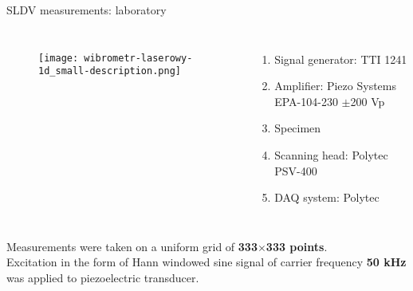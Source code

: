 \documentclass[10pt,aspectratio=169,dvipsnames]{beamer} %
\begin{document}
	\begin{frame}[t]{SLDV measurements: laboratory}
		\begin{columns}[T]
			\begin{figure}
				\texttt{[image: wibrometr-laserowy-1d\_small-description.png]}
			\end{figure}
			\begin{enumerate}
				\item Signal generator: TTI 1241 
				\item Amplifier: Piezo Systems EPA-104-230 $\pm$200 Vp
				\item Specimen
				\item Scanning head: Polytec PSV-400
				\item DAQ system: Polytec
			\end{enumerate}
		\end{columns}
		{\small
		Measurements were taken on a uniform grid of \textbf{333$\times$333 points}.\\
			Excitation in the form of Hann windowed sine signal of carrier frequency \textbf{50 kHz} was applied to piezoelectric transducer.}
	\end{frame}
		
	
\end{document}
